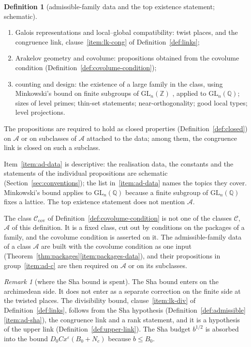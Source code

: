 \documentclass[11pt]{amsbook}
\theoremstyle{plain}
\theoremstyle{definition}
\newtheorem{definition}[theorem]{Definition}
\theoremstyle{remark}
\newtheorem{remark}[theorem]{Remark}
\numberwithin{equation}{section}
\numberwithin{figure}{chapter}
\numberwithin{table}{chapter}
\newcommand{\Q}{\mathbb{Q}}
\newcommand{\Z}{\mathbb{Z}}
\newcommand{\eps}{\varepsilon}
\begin{document}
\begin{definition}[admissible-family data and the top existence
statement; schematic]
\begin{enumerate}[label=(\arabic*)]
\begin{enumerate}[label=(\alph*)]
decomposition; integrality of periods up to the order of the
stabiliser;
\item Galois representations and local--global compatibility: twist
places, and the congruence link, clause~\ref{item:lk-cong} of
Definition~\ref{def:links};
\item\label{item:ad-c}
Arakelov geometry and covolume: propositions obtained from the
covolume condition (Definition~\ref{def:covolume-condition});
\item\label{item:ad-d}
counting and design: the existence of a large family in the
class, using Minkowski's bound on finite subgroups of
$\mathrm{GL}_n(\Z)$ \cite{Minkowski1887}, applied to
$\mathrm{GL}_n(\Q)$; sizes of level primes; thin-set statements;
near-orthogonality; good local types; level projections.
\end{enumerate}
The propositions are required to hold as closed properties
(Definition~\ref{def:closed}) on $\mathcal A$ or on subclasses of
$\mathcal A$ attached to the data; among them, the congruence link is
closed on such a subclass.
\end{enumerate}
\end{definition}

\noindent Item~\ref{item:ad-data} is descriptive: the realisation data, the
constants
and the statements of the individual propositions are schematic
(Section~\ref{sec:conventions}); the list in~\ref{item:ad-data} names
the topics they cover. Minkowski's bound applies to
$\mathrm{GL}_n(\Q)$ because a finite subgroup of $\mathrm{GL}_n(\Q)$
fixes a lattice. The top existence statement does not mention
$\mathcal A$.

The class $\mathcal C_{\mathrm{cov}}$ of
Definition~\ref{def:covolume-condition} is not one of the classes
$\mathcal C$, $\mathcal A$ of this definition. It is a fixed class, cut
out by conditions on the packages of a family, and the covolume
condition is asserted on it. The admissible-family data of a class
$\mathcal A$ are built with the covolume condition as one input
(Theorem~\ref{thm:packages}\ref{item:packages-data}), and their
propositions in group~\ref{item:ad-c} are then required on $\mathcal A$ or on
its
subclasses.

\begin{remark}[where the Sha bound is spent]\label{rem:sha-upper-link}
The Sha bound enters on the archimedean side. It does not enter as a
separate correction on the finite side at the twisted places. The divisibility
bound, clause~\ref{item:lk-div} of
Definition~\ref{def:links}, follows from the Sha hypothesis
(Definition~\ref{def:admissible}\ref{item:ad-sha}), the congruence link and a
rank
statement, and it is a hypothesis of the upper link
(Definition~\ref{def:upper-link}). The Sha budget $b^{1/2}$ is
absorbed into the bound $D_0Cx^\eps(B_0+N_c)$ because $b\le B_0$.
\end{remark}
\end{document}
